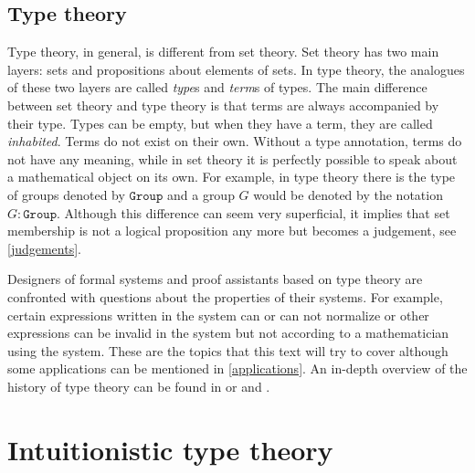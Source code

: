 \documentclass[12pt,a4paper,twoside,xetex]{book} %
\newcommand{\keyword}[1]{\emph{#1}\index{#1}}
\newcommand{\op}[1]{\mathtt{#1}}
\begin{document}




\subsection{Type theory}

Type theory, in general, is different from set theory. Set theory has two main layers: sets and propositions about elements of sets. In type theory, the analogues of these two layers are called \keyword{type}s and \keyword{term}s of types. The main difference between set theory and type theory is that terms are always accompanied by their type. Types can be empty, but when they have a term, they are called \keyword{inhabited}. Terms do not exist on their own. Without a type annotation, terms do not have any meaning, while in set theory it is perfectly possible to speak about a mathematical object on its own. For example, in type theory there is the type of groups denoted by $\op{Group}$ and a group $G$ would be denoted by the notation $G : \op{Group}$. Although this difference can seem very superficial, it implies that set membership is not a logical proposition any more but becomes a judgement, see \cref{judgements}.

Designers of formal systems and proof assistants based on type theory are confronted with questions about the properties of their systems. For example, certain expressions written in the system can or can not normalize or other expressions can be invalid in the system but not according to a mathematician using the system. These are the topics that this text will try to cover although some applications can be mentioned in \cref{applications}. An in-depth overview of the history of type theory can be found in \cite{Coquand2013oct} or \cite{Constable2011} and \cite{Constable2015July}.


\section{Intuitionistic type theory}
\end{document}
